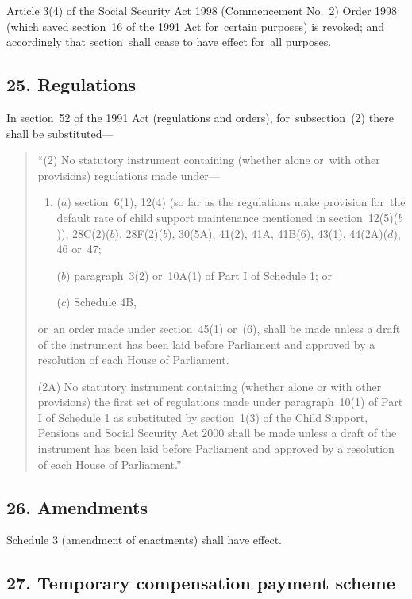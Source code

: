 \documentclass[12pt,a4paper]{article}
\begin{document}
Article 3(4)  of the  Social Security Act 1998 (Commencement No.\ 2) Order 1998 (which saved section~16 of the 1991 Act for~certain purposes) is revoked; and accordingly that section~shall cease to have effect for~all purposes.

\subsection{25. Regulations}

In section~52 of the 1991 Act (regulations and orders), for~subsection~(2)  there shall be substituted—
\begin{quotation}
“(2) No statutory instrument containing (whether alone or~with other provisions) regulations made under—
\begin{enumerate}\item[]
($a$) section~6(1), 12(4)  (so far as the regulations make provision for~the default rate of child support maintenance mentioned in section~12(5)($b$)), 28C(2)($b$), 28F(2)($b$), 30(5A), 41(2), 41A, 41B(6), 43(1), 44(2A)($d$), 46 or~47;

($b$) paragraph~3(2)  or~10A(1)  of Part I of Schedule 1; or

($c$) Schedule 4B,
\end{enumerate}
or~an order made under section~45(1)  or~(6), shall be made unless a draft of the instrument has been laid before Parliament and approved by a resolution of each House of Parliament.

(2A) No statutory instrument containing (whether alone or with other provisions) the first set of regulations made under paragraph~10(1)  of Part I of Schedule 1 as substituted by section~1(3)  of the Child Support, Pensions and Social Security Act 2000 shall be made unless a draft of the instrument has been laid before Parliament and approved by a resolution of each House of Parliament.”
\end{quotation}


\subsection{26. Amendments}

Schedule 3 (amendment of enactments) shall have effect.

\subsection{27. Temporary compensation payment scheme}
\end{document}
